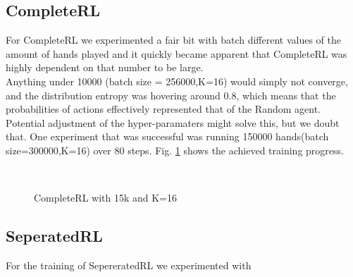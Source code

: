 \subsection{CompleteRL}
For CompleteRL we experimented a fair bit with batch different values of the amount of hands played and it quickly
became apparent that CompleteRL was highly dependent on that number to be large.\\
Anything under 10000 (batch size = 256000,K=16) would simply not converge, and the distribution entropy was hovering
around 0.8, which means that the probabilities of actions effectively represented that of the Random agent.\\
Potential adjustment of the hyper-paramaters might solve this, but we doubt that.
\newline
One experiment that was successful was running 150000 hands(batch size=300000,K=16) over 80 steps.
Fig. \ref{fig:15comp} shows the achieved training progress.
\begin{figure}[!ht]
    \centering
    \quad
    \\
    \quad
    \caption{CompleteRL with 15k and K=16}
    \label{fig:15comp}
\end{figure}

\subsection{SeperatedRL}
For the training of SepereratedRL we experimented with
